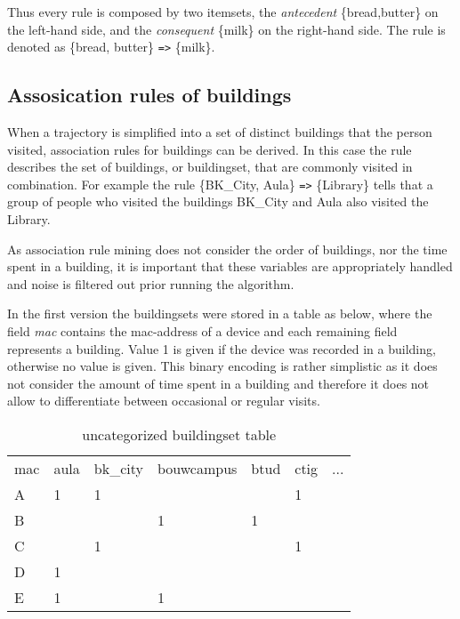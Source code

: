 Thus every rule is composed by two itemsets, the \textit{antecedent}
\{bread,butter\} on the left-hand side, and the \textit{consequent} \{milk\} on
the right-hand side. The rule is denoted as \{bread, butter\} \verb|=>| \{milk\}.

\subsection{Assosication rules of buildings}
When a trajectory is simplified into a set of distinct buildings that the person
visited, association rules for buildings can be derived. In this case the rule
describes the set of buildings, or buildingset, that are commonly visited in
combination. For example the rule \{BK\_City, Aula\} \verb|=>| \{Library\}
tells that a group of people who visited the buildings BK\_City and Aula also
visited the Library.

As association rule mining does not consider the order of buildings, nor the
time spent in a building, it is important that these variables are appropriately
handled and noise is filtered out prior running the algorithm.

In the first version the buildingsets were stored in a table as below, where the
field \textit{mac} contains the mac-address of a device and each remaining field
represents a building. Value 1 is given if the device was recorded in a
building, otherwise no value is given. This binary encoding is rather simplistic
as it does not consider the amount of time spent in a building and therefore it
does not allow to differentiate between occasional or regular visits.

\begin{table}[H]
\centering
\captionsetup{justification=centering}
\caption{uncategorized buildingset table}
\label{uncategorized buildingset table}
\begin{tabular}{lllllll}
\cline{1-7}
mac & aula & bk\_city & bouwcampus & btud & ctig & ... \\ \cline{1-7}
A   & 1 & 1     &           &   & 1 &   \\
B   &   &       & 1         & 1 &   &   \\
C   &   & 1     &           &   & 1 &   \\
D   & 1 &       &           &   &   &   \\
E   & 1 &       & 1         &   &   &   \\ \cline{1-7}
\end{tabular}
\end{table}


